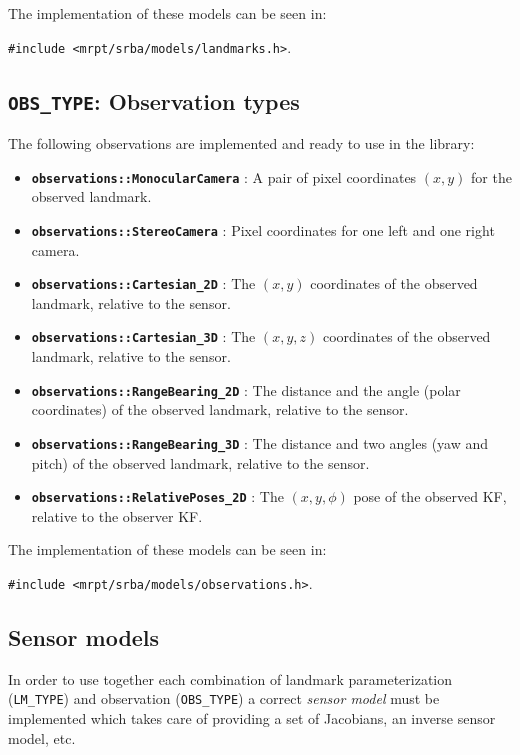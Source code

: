 \documentclass[a4paper,11pt]{article}
\begin{document}
The implementation of these models can be seen in:

\texttt{\#include <mrpt/srba/models/landmarks.h>}.

\vspace{1cm}
\subsection{\texttt{OBS\_TYPE}: Observation types}

The following observations are implemented and ready to use in the library:

\begin{itemize}
\item{\textbf{ \texttt{observations::MonocularCamera} }: A pair of pixel coordinates $(x,y)$ for the observed landmark.}
\item{\textbf{ \texttt{observations::StereoCamera} }: Pixel coordinates for one left and one right camera.}
\item{\textbf{ \texttt{observations::Cartesian\_2D} }: The $(x,y)$ coordinates of the observed landmark, relative to the sensor.}
\item{\textbf{ \texttt{observations::Cartesian\_3D} }: The $(x,y,z)$ coordinates of the observed landmark, relative to the sensor.}
\item{\textbf{ \texttt{observations::RangeBearing\_2D} }: The distance and the angle (polar coordinates) of the observed landmark, relative to
the sensor.}
\item{\textbf{ \texttt{observations::RangeBearing\_3D} }: The distance and two angles (yaw and pitch) of the observed landmark, relative
to the sensor.}
\item{\textbf{ \texttt{observations::RelativePoses\_2D} }: The $(x,y,\phi)$ pose of the observed KF, relative to the observer KF.}
\end{itemize}

The implementation of these models can be seen in:

\texttt{\#include <mrpt/srba/models/observations.h>}.


\subsection{Sensor models}
\label{sect:program_sensors}

In order to use together each combination of landmark parameterization (\texttt{LM\_TYPE}) and 
observation (\texttt{OBS\_TYPE}) a correct \emph{sensor model} must be implemented which 
takes care of providing a set of Jacobians, an inverse sensor model, etc.
\end{document}
